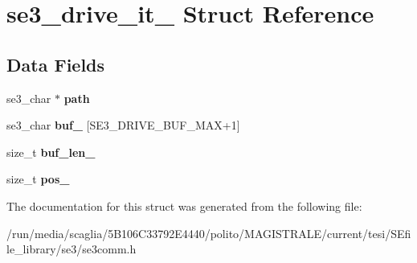 \hypertarget{structse3__drive__it__}{\section{se3\-\_\-drive\-\_\-it\-\_\- Struct Reference}
\label{structse3__drive__it__}
}
\subsection*{Data Fields}
\begin{DoxyCompactItemize}
\item 
\hypertarget{structse3__drive__it___a79a2c5c080ef46f7a81d6b05a3d23bd9}{se3\-\_\-char $\ast$ {\bfseries path}}\label{structse3__drive__it___a79a2c5c080ef46f7a81d6b05a3d23bd9}

\item 
\hypertarget{structse3__drive__it___a8e864013c4f593abb1d801cdbeb336b2}{se3\-\_\-char {\bfseries buf\-\_\-} \mbox{[}S\-E3\-\_\-\-D\-R\-I\-V\-E\-\_\-\-B\-U\-F\-\_\-\-M\-A\-X+1\mbox{]}}\label{structse3__drive__it___a8e864013c4f593abb1d801cdbeb336b2}

\item 
\hypertarget{structse3__drive__it___a1733d235b0f5b5a649d767f2f4f7ea5f}{size\-\_\-t {\bfseries buf\-\_\-len\-\_\-}}\label{structse3__drive__it___a1733d235b0f5b5a649d767f2f4f7ea5f}

\item 
\hypertarget{structse3__drive__it___a171fa05ba77bf4553093f3ce8c88df07}{size\-\_\-t {\bfseries pos\-\_\-}}\label{structse3__drive__it___a171fa05ba77bf4553093f3ce8c88df07}

\end{DoxyCompactItemize}


The documentation for this struct was generated from the following file\-:\begin{DoxyCompactItemize}
\item 
/run/media/scaglia/5\-B106\-C33792\-E4440/polito/\-M\-A\-G\-I\-S\-T\-R\-A\-L\-E/current/tesi/\-S\-Efile\-\_\-library/se3/se3comm.\-h\end{DoxyCompactItemize}
